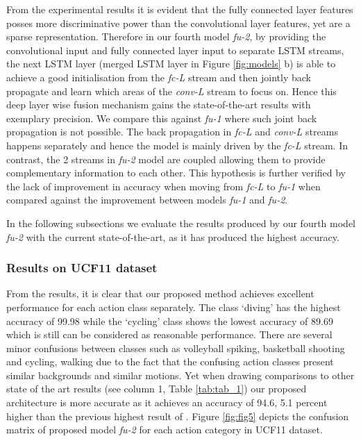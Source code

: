 \documentclass[10pt,twocolumn,letterpaper]{article}
\begin{document}
From the experimental results it is evident that the fully connected layer features posses more discriminative power than the convolutional layer features, yet are a sparse representation. Therefore in our fourth model \textit{fu-2}, by providing the convolutional input and fully connected layer input to separate LSTM streams, the next LSTM layer (merged LSTM layer in Figure \ref{fig:models} b) is able to achieve a good initialisation from the \textit{fc-L} stream and then jointly back propagate and learn which areas of the \textit{conv-L} stream to focus on. Hence this deep layer wise fusion mechanism gains the state-of-the-art results with exemplary precision. We compare this against \textit{fu-1} where such joint back propagation is not possible. The back propagation in \textit{fc-L} and \textit{conv-L} streams happens separately and hence the model is mainly driven by the \textit{fc-L} stream. In contrast, the 2 streams in \textit{fu-2} model are coupled allowing them to provide complementary information to each other. This hypothesis is further verified by the lack of improvement in accuracy when moving from \textit{fc-L} to \textit{fu-1} when compared against the improvement between models \textit{fu-1} and \textit{fu-2}. 
\par
 In the following subsections we evaluate the results produced by our fourth model \textit{fu-2} with the current state-of-the-art, as it has produced the highest accuracy. 


\subsubsection{Results on UCF11 dataset}

 From the results, it is clear that our proposed method achieves excellent performance for each action class separately. The class `diving' has the highest accuracy of 99.98 while the `cycling' class shows the lowest accuracy of 89.69 which is still can be considered as reasonable performance. There are several minor confusions between classes such as volleyball spiking, basketball shooting and cycling, walking due to the fact that the confusing action classes present similar backgrounds and similar motions. Yet when drawing comparisons to other state of the art results (see column 1, Table \ref{tab:tab_1}) our proposed architecture is more accurate as it achieves an accuracy of 94.6, 5.1 percent higher than the previous highest result of \cite{Ravanbakhsh15}. Figure \ref{fig:fig5} depicts the confusion matrix of proposed model \textit{fu-2} for each action category in UCF11 dataset.
  
\end{document}
